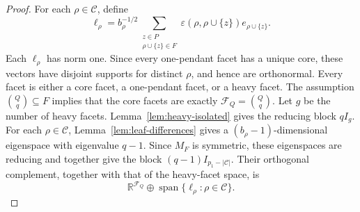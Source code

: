 \documentclass[11pt]{article}
\newcommand{\Span}{\operatorname{span}}
\newcommand{\calC}{\mathcal{C}}
\newcommand{\calF}{\mathcal{F}}
\begin{document}
\begin{proof}
For each \(\rho\in\calC\), define
\[
\boldsymbol{\ell}_\rho
=
b_\rho^{-1/2}
\sum_{\substack{z\in P\\ \rho\cup\{z\}\in F}}
\varepsilon(\rho,\rho\cup\{z\})e_{\rho\cup\{z\}}.
\]
Each \(\boldsymbol{\ell}_\rho\) has norm one. Since every one-pendant
facet has a unique core, these vectors have disjoint supports for
distinct \(\rho\), and hence are orthonormal.
Every facet is either a core facet, a one-pendant facet, or a heavy
facet. The assumption \(\binom Qq\subseteq F\) implies that the core
facets are exactly \(\calF_Q=\binom Qq\). Let \(g\) be the number of
heavy facets. Lemma~\ref{lem:heavy-isolated} gives the reducing block
\(qI_g\). For each \(\rho\in\calC\),
Lemma~\ref{lem:leaf-differences} gives a
\((b_\rho-1)\)-dimensional eigenspace with eigenvalue \(q-1\).
Since \(M_F\) is symmetric, these eigenspaces are reducing and together
give the block \((q-1)I_{p_1-|\calC|}\). Their orthogonal complement,
together with that of the heavy-facet space, is
\[
\mathbb R^{\calF_Q}
\oplus
\Span\{\boldsymbol{\ell}_\rho:\rho\in\calC\}.
\]


\end{proof}
\end{document}
